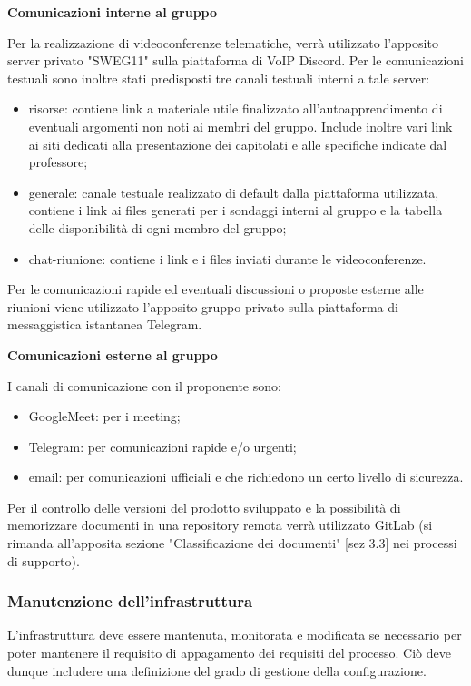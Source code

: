 \textbf{Comunicazioni interne al gruppo}

 Per la realizzazione di videoconferenze telematiche, verrà utilizzato l'apposito server privato "SWEG11" sulla piattaforma di VoIP Discord.
Per le comunicazioni testuali sono inoltre stati predisposti tre canali testuali interni a tale server:

\begin{itemize}
    \item risorse: contiene link a materiale utile finalizzato all'autoapprendimento di eventuali argomenti non noti ai membri del gruppo. Include inoltre vari link ai siti dedicati alla presentazione dei capitolati e  alle specifiche indicate dal professore;
    \item generale: canale testuale realizzato di default dalla piattaforma utilizzata, contiene i link ai files generati per i sondaggi interni al gruppo e la tabella delle disponibilità di ogni membro del gruppo;
    \item chat-riunione: contiene i link e i files inviati durante le videoconferenze.
\end{itemize}

Per le comunicazioni rapide ed eventuali discussioni o proposte esterne alle riunioni viene utilizzato l'apposito gruppo privato sulla piattaforma di messaggistica istantanea Telegram.

\textbf{Comunicazioni esterne al gruppo}

I canali di comunicazione con il proponente sono:
\begin{itemize}
    \item GoogleMeet: per i meeting; 
    \item Telegram: per comunicazioni rapide e/o urgenti;
    \item email: per comunicazioni ufficiali e che richiedono un certo livello di sicurezza.
\end{itemize}

Per il controllo delle versioni del prodotto sviluppato e la possibilità di memorizzare documenti in una repository remota verrà utilizzato GitLab (si rimanda all'apposita sezione "Classificazione dei documenti" [sez 3.3] nei processi di supporto).

\subsubsection{Manutenzione dell'infrastruttura}
L'infrastruttura deve essere mantenuta, monitorata e modificata se necessario per poter mantenere il requisito di appagamento dei requisiti del processo. Ciò deve dunque includere una definizione del grado di gestione della configurazione.

